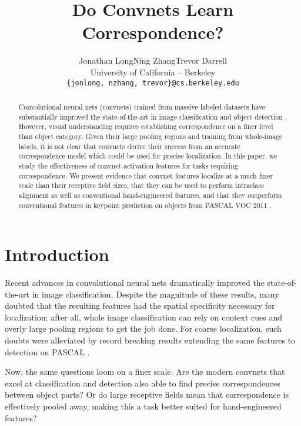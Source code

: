 \documentclass{article} \usepackage{nips14submit_e,times}
\title{Do Convnets Learn Correspondence?}
\author{
Jonathan Long\hspace{3em}Ning Zhang\hspace{3em}Trevor Darrell \\
University of California -- Berkeley \\
\texttt{\{jonlong, nzhang, trevor\}@cs.berkeley.edu} \\
}
\begin{document}
\maketitle

\begin{abstract}
    Convolutional neural nets (convnets) trained from massive labeled datasets
    \cite{ImageNet} have substantially improved the state-of-the-art in image
    classification \cite{Krizhevsky} and object detection \cite{RossJeff}.
    However, visual understanding requires establishing correspondence on a finer
    level than object category.
    Given their large pooling regions and training from whole-image labels, it
    is not clear that convnets derive their success from an accurate
    correspondence model which could be used for precise localization.
    In this paper, we study the effectiveness of convnet activation features for
    tasks requiring correspondence.
    We present evidence that convnet features localize at a much finer scale
    than their receptive field sizes, that they can be used to perform intraclass
    alignment as well as conventional hand-engineered features, and that they
    outperform conventional features in keypoint prediction on objects from
    PASCAL VOC 2011 \cite{pascal}.

\end{abstract}

\section{Introduction}

Recent advances in convolutional neural nets \cite{Krizhevsky} dramatically
improved the state-of-the-art in image classification.
Despite the magnitude of these results, many doubted
\cite{YannLeCunsGooglePlusPage} that the resulting features had the spatial
specificity necessary for localization; after all, whole image classification
can rely on context cues and overly large pooling regions to get the job done.
For coarse localization, such doubts were alleviated by record breaking results
extending the same features to detection on PASCAL \cite{RossJeff}.

Now, the same questions loom on a finer scale. Are the modern convnets that
excel at classification and detection also able to find precise correspondences
between object parts?
Or do large receptive fields mean that correspondence is effectively pooled
away, making this a task better suited for hand-engineered features?
\end{document}
